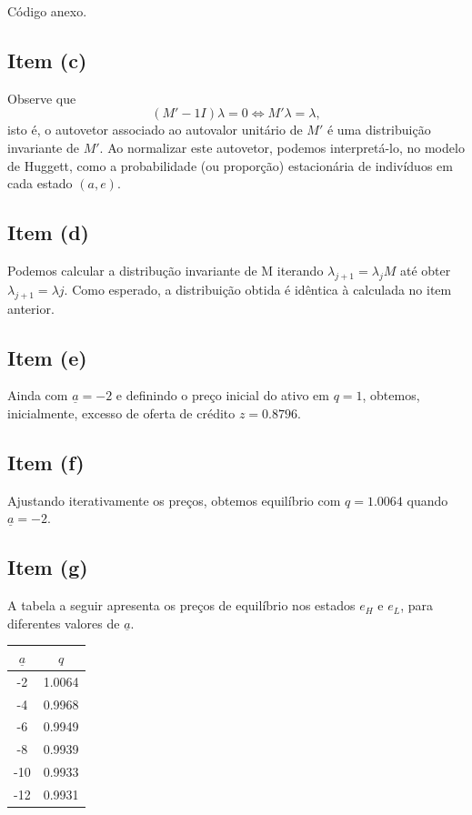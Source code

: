 \documentclass{article}
\begin{document}
Código anexo.

\subsection*{Item (c)}

Observe que $$(M' - 1I) \lambda = 0 \iff M' \lambda = \lambda,$$ isto é, 
o autovetor associado ao autovalor unitário de $M'$ é uma 
distribuição invariante de $M'$. Ao normalizar este autovetor,
podemos interpretá-lo, no modelo de Huggett, como a probabilidade (ou proporção) 
estacionária de indivíduos em cada estado $(a, e)$.

\subsection*{Item (d)}

Podemos calcular a distribução invariante de M iterando $\lambda_{j+1} = \lambda_j M$ até
obter $\lambda_{j+1} = \lambda{j}$. Como esperado, a distribuição obtida é idêntica à
calculada no item anterior.

\subsection*{Item (e)}

Ainda com $\underline{a} = -2$ e definindo o preço inicial do ativo 
em $q = 1$, obtemos, inicialmente, excesso de oferta de 
crédito $z = 0.8796$.

\subsection*{Item (f)}

Ajustando iterativamente os preços, obtemos equilíbrio com $q = 1.0064$ quando $\underline{a} = -2$.

\subsection*{Item (g)}

A tabela a seguir apresenta os preços de equilíbrio nos estados $e_H$ e $e_L$,
para diferentes valores de $\underline{a}$. \\

\begin{center}
\begin{tabular}{cc}
	\hline $\underline{a}$ & $q$ \\ \hline
	-2  &  1.0064 \\
	-4  &  0.9968 \\
	-6  &  0.9949 \\
	-8  &  0.9939 \\
   -10  &  0.9933 \\
   -12  &  0.9931 \\ \hline
\end{tabular}
\end{center}
\end{document}
